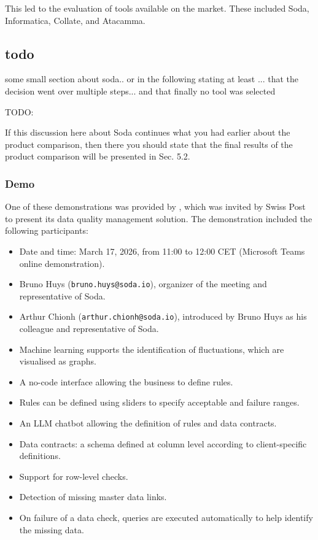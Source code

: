 This led to the evaluation of tools available on the market. These included Soda, Informatica, Collate, and Atacamma.

\subsection{todo}
some small section about soda.. or in the following stating at least ... that the decision went over multiple steps...
and that finally no tool was selected

TODO:

If this discussion here about Soda continues what you had earlier about the product comparison, then there you should state that the final results of the product comparison will be presented in Sec. 5.2.



\subsubsection*{Demo}

One of these demonstrations was provided by \cite{Soda2026}, which was invited by Swiss Post to present its data quality management solution. The demonstration included the following participants:

\begin{itemize}
    \item Date and time: March 17, 2026, from 11:00 to 12:00 CET (Microsoft Teams online demonstration).
    \item Bruno Huys (\texttt{bruno.huys@soda.io}), organizer of the meeting and representative of Soda.
    \item Arthur Chionh (\texttt{arthur.chionh@soda.io}), introduced by Bruno Huys as his colleague and representative of Soda.
\end{itemize}


\begin{itemize}
    \item Machine learning supports the identification of fluctuations, which are visualised as graphs.
    \item A no-code interface allowing the business to define rules.
    \item Rules can be defined using sliders to specify acceptable and failure ranges.
    \item An LLM chatbot allowing the definition of rules and data contracts.
    \item Data contracts: a schema defined at column level according to client-specific definitions.
    \item Support for row-level checks.
    \item Detection of missing master data links.
    \item On failure of a data check, queries are executed automatically to help identify the missing data.
\end{itemize}



